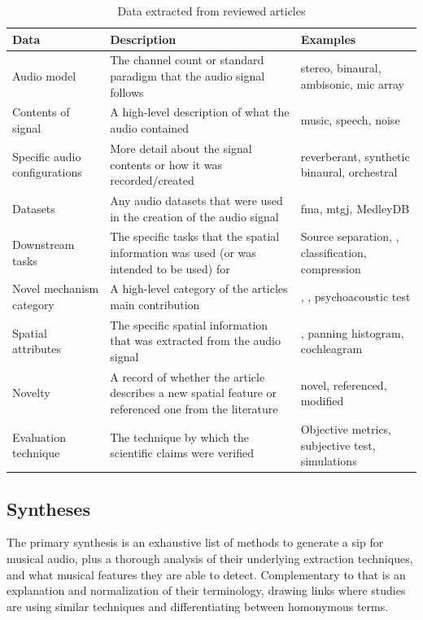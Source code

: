 \documentclass[referee,pdflatex,sn-mathphys-num]{sn-jnl}%
\begin{document}
\begin{table}[htb]
  \renewcommand{\arraystretch}{1.3} %
  \centering
  \caption{Data extracted from reviewed articles}
  \begin{tabularx}{\textwidth}{sff}
      \toprule
      Data & Description & Examples \\
      \midrule
      Audio model & The channel count or standard paradigm that the audio signal follows & stereo, binaural, ambisonic, mic array \\
      Contents of signal & A high-level description of what the audio contained & music, speech, noise \\
      Specific audio configurations & More detail about the signal contents or how it was recorded/created & reverberant, synthetic binaural, orchestral \\
      Datasets & Any audio datasets that were used in the creation of the audio signal & \gls{fma}, \gls{mtgj}, MedleyDB \\
      Downstream tasks & The specific tasks that the spatial information was used (or was intended to be used) for & Source separation, , classification, compression \\
      Novel mechanism category & A high-level category of the articles main contribution & , , psychoacoustic test \\
      Spatial attributes & The specific spatial information that was extracted from the audio signal & , panning histogram, cochleagram \\
      Novelty & A record of whether the article describes a new spatial feature or referenced one from the literature & novel, referenced, modified \\
      Evaluation technique & The technique by which the scientific claims were verified & Objective metrics, subjective test, simulations \\
      \bottomrule
  \end{tabularx}
  \label{tab:data_extraction}
\end{table}


\subsection{Syntheses}
\label{sec:syntheses}

The primary synthesis is an exhaustive list of methods to generate a \gls{sip} for musical audio, plus a thorough analysis of  their underlying extraction techniques, and what musical features they are able to detect. Complementary to that is an explanation and normalization of their terminology, drawing links where studies are using similar techniques and differentiating between homonymous terms.
\end{document}
